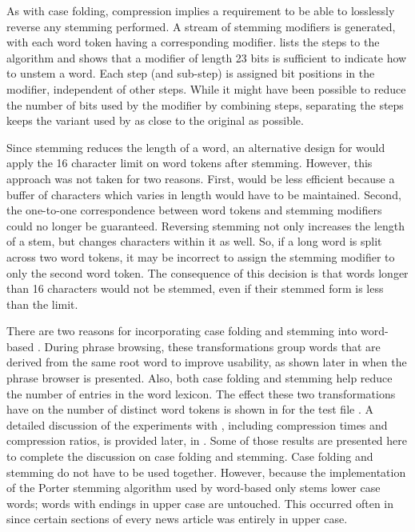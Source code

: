 As with case folding, compression implies a  
requirement to be able to losslessly reverse any stemming performed.
A stream of stemming modifiers is generated, with each
word token having a corresponding modifier.
 lists the steps to the algorithm and 
shows that a modifier
of length 23 bits is sufficient to indicate how to unstem a
word.  Each step (and sub-step) is 
assigned bit positions in the modifier, independent of other
steps.  While it might have been possible to reduce the number
of bits used by the modifier by combining steps, separating the
steps keeps the variant used by \repair as close to
the original as possible.

Since stemming reduces the length of a word, an alternative design
for \prepair would apply the 16 character
limit on word tokens after stemming.  However, this approach
was not taken for two reasons.  First, \prepair would be less
efficient because a buffer of characters which varies in length
would have to be maintained.  
Second, the one-to-one correspondence between
word tokens and stemming modifiers could no longer be guaranteed.
Reversing stemming not only increases the length of
a stem, but changes characters within it as well.  So, if
a long word is split across two word tokens, it may be incorrect
to assign the stemming modifier to only the second word token.
The consequence of this decision is that words longer than 16
characters would not be stemmed, even if their stemmed form
is less than the limit.

There are two reasons for incorporating case folding and stemming
into word-based \repair.  During phrase browsing, these transformations
group words that are derived from the same root word 
to improve usability, as shown later in 
when the phrase browser is presented.  Also,
both case folding and stemming help reduce the number of entries in
the word lexicon.  
The effect these two transformations have on the number of distinct
word tokens is shown in  for the
test file \wsja.  A detailed discussion of the experiments with 
\wsja, including compression times and
compression ratios, is provided later, in .
Some of those results are presented here to complete
the discussion on case folding and stemming.
Case folding and stemming do not have to be used together.
However, because the implementation of 
the Porter stemming algorithm used by word-based \repair
only stems lower case words; words with endings in upper case 
are untouched.  This occurred often in \wsja
since certain sections of every news article was 
entirely in upper case.

